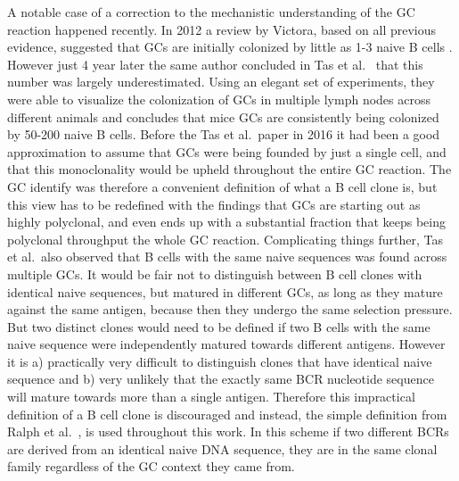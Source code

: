 A notable case of a correction to the mechanistic understanding of the GC reaction happened recently.
In 2012 a review by Victora, based on all previous evidence, suggested that GCs are initially colonized by little as 1-3 naive B cells \cite{victora2012germinal}.
However just 4 year later the same author concluded in Tas et al.\ \cite{tas2016visualizing} that this number was largely underestimated.
Using an elegant set of experiments, they were able to visualize the colonization of GCs in multiple lymph nodes across different animals and concludes that mice GCs are consistently being colonized by 50-200 naive B cells.
Before the Tas et al.\ paper in 2016 it had been a good approximation to assume that GCs were being founded by just a single cell, and that this monoclonality would be upheld throughout the entire GC reaction.
The GC identify was therefore a convenient definition of what a B cell clone is, but this view has to be redefined with the findings that GCs are starting out as highly polyclonal, and even ends up with a substantial fraction that keeps being polyclonal throughput the whole GC reaction.
Complicating things further, Tas et al.\ also observed that B cells with the same naive sequences was found across multiple GCs.
It would be fair not to distinguish between B cell clones with identical naive sequences, but matured in different GCs, as long as they mature against the same antigen, because then they undergo the same selection pressure.
But two distinct clones would need to be defined if two B cells with the same naive sequence were independently matured towards different antigens.
However it is a) practically very difficult to distinguish clones that have identical naive sequence and b) very unlikely that the exactly same BCR nucleotide sequence will mature towards more than a single antigen.
Therefore this impractical definition of a B cell clone is discouraged and instead, the simple definition from Ralph et al.\ \cite{ralph2016likelihood}, is used throughout this work.
In this scheme if two different BCRs are derived from an identical naive DNA sequence, they are in the same clonal family regardless of the GC context they came from.

